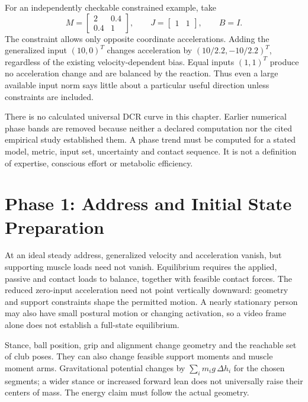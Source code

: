 For an independently checkable constrained example, take
\begin{equation}
M=\begin{bmatrix}2&0.4\\0.4&1\end{bmatrix},\qquad
J=\begin{bmatrix}1&1\end{bmatrix},\qquad B=I.
\label{eq:complete_gain_example}
\end{equation}
The constraint allows only opposite coordinate accelerations. Adding the generalized input $(10,0)^T$ changes acceleration by $(10/2.2,-10/2.2)^T$, regardless of the existing velocity-dependent bias. Equal inputs $(1,1)^T$ produce no acceleration change and are balanced by the reaction. Thus even a large available input norm says little about a particular useful direction unless constraints are included.

There is no calculated universal DCR curve in this chapter. Earlier numerical phase bands are removed because neither a declared computation nor the cited empirical study established them. A phase trend must be computed for a stated model, metric, input set, uncertainty and contact sequence. It is not a definition of expertise, conscious effort or metabolic efficiency.

\section{Phase 1: Address and Initial State Preparation}

At an ideal steady address, generalized velocity and acceleration vanish, but supporting muscle loads need not vanish. Equilibrium requires the applied, passive and contact loads to balance, together with feasible contact forces. The reduced zero-input acceleration need not point vertically downward: geometry and support constraints shape the permitted motion. A nearly stationary person may also have small postural motion or changing activation, so a video frame alone does not establish a full-state equilibrium.

Stance, ball position, grip and alignment change geometry and the reachable set of club poses. They can also change feasible support moments and muscle moment arms. Gravitational potential changes by $\sum_i m_i g\,\Delta h_i$ for the chosen segments; a wider stance or increased forward lean does not universally raise their centers of mass. The energy claim must follow the actual geometry.

